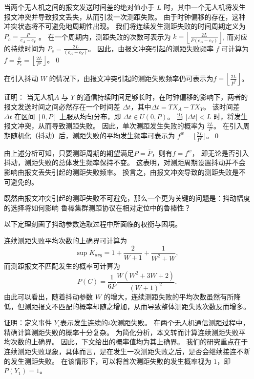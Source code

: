 当两个无人机之间的报文发送时间差的绝对值小于 $L$  时，其中一个无人机将发生报文冲突并导致报文丢失，从而引发一次测距失败。
由于时钟偏移的存在，这种冲突状态将不可避免地周期性出现。 
我们将连续发生测距失败的时间周期定义为 $P_c=\frac{P}{e_{A}-e_{Y}}$ 。
在一个周期内，测距失败的次数可表示为 $k=\left\lfloor \frac{2L}{P(e_{A}-e_{Y})}\right\rfloor$​ , 而对应的持续时间为 $P_{s}=\frac{2L}{(e_{A}-e_{Y})}$。 
因此，由报文冲突引起的测距失败频率 $ f$ 可计算为$f=\frac{k}{P_{c}}=\left\lfloor \frac{2L}{P^{2}}\right\rfloor$。​\qed

\begin{lemma}
在引入抖动 $W$ 的情况下，由报文冲突引起的测距失败频率仍可表示为$f=\left\lfloor \frac{2L}{\overline{P}^{2}}\right\rfloor$。
  \end{lemma}
证明：
当无人机$A$ 与 $ Y$ 的通信持续时间足够长时，在时钟偏移的影响下，两者的报文发送时间之间必然存在一个时间差 $\Delta t$，其中$\Delta t = TX_{A}-TX_{Y}$。
该时间差  $\Delta t$ 在区间 $[0, P]$ 上服从均匀分布，即 $\Delta t \in U(0, P)$。
 当 $ \left| \Delta t \right | < L $ 时，将发生报文冲突，从而导致测距失败。
 因此，单次测距发生失败的概率为 $\frac{2L}{P}$​ 。 
在引入周期随机化（抖动）后，测距失败的平均发生频率可表示为 $f^{w}=\lfloor \frac{2L}{P^{2}}\rfloor$。
​\qed

由上述分析可知，只要测距周期的期望满足$P=\overline{P}$，则有$f=f^{w}$​，
即无论是否引入抖动，测距失败的总体发生频率保持不变。
这表明，对测距周期设置抖动并不会影响由报文丢失引起的测距失败频率。
换言之，由报文冲突导致的测距失败是不可避免的。

既然由报文冲突引起的测距失败不可避免，那么一个更为关键的问题是：抖动幅度的选择将如何影响 鲁棒集群测距协议在相对定位中的鲁棒性？

以下定理刻画了抖动参数选取过程中所面临的权衡与困境。

\begin{theorem}
连续测距失败平均次数的上确界可计算为 
\begin{equation}
  \sup K_{avg}=1+\frac{2}{W+1}+\frac{1}{W^2+W}, 
\end{equation}
而测距报文不匹配发生的概率可计算为
\begin{equation}
  P(C)=\frac{1}{6P}\frac{W(W^2+3W+2)}{(W+1)^2}.
  \end{equation}
由此可以看出，随着抖动参数 $W$ 的增大，连续测距失败的平均次数虽然有所降低，但测距报文不匹配的概率却随之增加，从而导致整体测距失败次数反而增多。
\end{theorem}

证明：定义事件 $Y_{i}$ ​ 表示发生连续的$i$次测距失败。 
在两个无人机通信测距过程中，精确计算测距失败的概率十分复杂。
为简化分析，本文转而计算连续测距失败平均次数的上确界。
因此，下文给出的概率值均为其上确界。
我们的研究重点在于连续测距失败现象，具体而言，是在发生一次测距失败之后，是否会继续接连不断的发生测距失败。
在该情形下，可以将首次测距失败的发生概率视为 $1$，即 $P(Y_{1})=1$。

